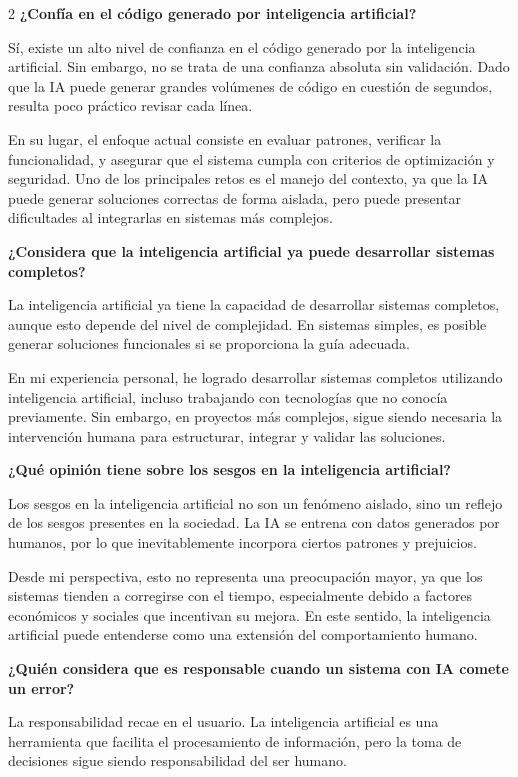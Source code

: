 \documentclass[10pt,spanish,Letterpaper,openany]{book}
\let\origtextbf\textbf
\renewcommand{\textbf}[1]{{\color{textlinetitle}\origtextbf{#1}}}
\begin{document}
\begin {multicols}{2}
\textbf{¿Confía en el código generado por inteligencia artificial?}

Sí, existe un alto nivel de confianza en el código generado por la inteligencia artificial. Sin embargo, no se trata de una confianza absoluta sin validación. Dado que la IA puede generar grandes volúmenes de código en cuestión de segundos, resulta poco práctico revisar cada línea.

En su lugar, el enfoque actual consiste en evaluar patrones, verificar la funcionalidad, y asegurar que el sistema cumpla con criterios de optimización y seguridad. Uno de los principales retos es el manejo del contexto, ya que la IA puede generar soluciones correctas de forma aislada, pero puede presentar dificultades al integrarlas en sistemas más complejos.

\textbf{¿Considera que la inteligencia artificial ya puede desarrollar sistemas completos?}

La inteligencia artificial ya tiene la capacidad de desarrollar sistemas completos, aunque esto depende del nivel de complejidad. En sistemas simples, es posible generar soluciones funcionales si se proporciona la guía adecuada.

En mi experiencia personal, he logrado desarrollar sistemas completos utilizando inteligencia artificial, incluso trabajando con tecnologías que no conocía previamente. Sin embargo, en proyectos más complejos, sigue siendo necesaria la intervención humana para estructurar, integrar y validar las soluciones.

\textbf{¿Qué opinión tiene sobre los sesgos en la inteligencia artificial?}

Los sesgos en la inteligencia artificial no son un fenómeno aislado, sino un reflejo de los sesgos presentes en la sociedad. La IA se entrena con datos generados por humanos, por lo que inevitablemente incorpora ciertos patrones y prejuicios.

Desde mi perspectiva, esto no representa una preocupación mayor, ya que los sistemas tienden a corregirse con el tiempo, especialmente debido a factores económicos y sociales que incentivan su mejora. En este sentido, la inteligencia artificial puede entenderse como una extensión del comportamiento humano.

\textbf{¿Quién considera que es responsable cuando un sistema con IA comete un error?}

La responsabilidad recae en el usuario. La inteligencia artificial es una herramienta que facilita el procesamiento de información, pero la toma de decisiones sigue siendo responsabilidad del ser humano.


\end{multicols}
\end{document}
